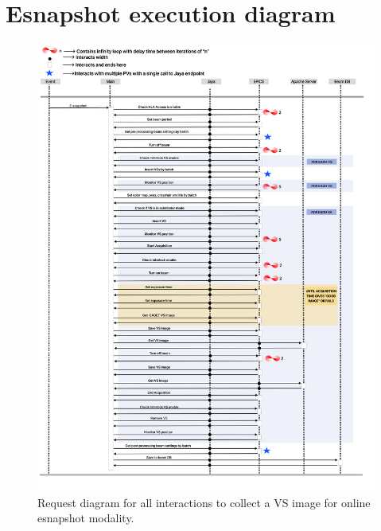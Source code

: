 \documentclass{article}
\begin{document}
\section{Esnapshot execution diagram} \label{appendix:esnapshot_exe}
\begin{figure}[!h]  
  \centering
  \includegraphics[width=\linewidth]{images/e_snapshot.png}
  \caption{Request diagram for all interactions to collect a VS image for online esnapshot modality.}
  \label{fig:100}
\end{figure} 
\end{document}
